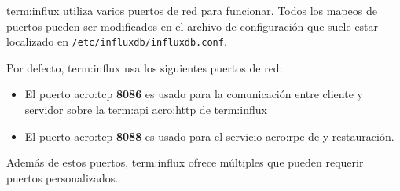 \gls{term:influx} utiliza varios puertos de red para funcionar. Todos los
mapeos de puertos pueden ser modificados en el archivo de configuración que
suele estar localizado en \texttt{/etc/influxdb/influxdb.conf}.

Por defecto, \gls{term:influx} usa los siguientes puertos de red:

\begin{itemize}

  \item
  El puerto \gls{acro:tcp} \textbf{8086} es usado para la comunicación entre cliente y
  servidor sobre la \gls{term:api} \gls{acro:http} de \gls{term:influx}

  \item
    El puerto \gls{acro:tcp} \textbf{8088} es usado para el servicio \gls{acro:rpc} de  y
  restauración.

\end{itemize}

Además de estos puertos, \gls{term:influx} ofrece múltiples  que pueden
requerir puertos personalizados.

